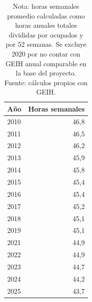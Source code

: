 \begin{table}[H]
\centering
\caption{Horas semanales promedio por trabajador, 2010--2025}
\label{tab:horas_semanales_promedio}
\small
\begin{tabular}{lr}
\toprule
Año & Horas semanales \\
\midrule
2010 & 46,8 \\
2011 & 46,5 \\
2012 & 46,2 \\
2013 & 45,9 \\
2014 & 45,8 \\
2015 & 45,4 \\
2016 & 45,4 \\
2017 & 45,2 \\
2018 & 45,1 \\
2019 & 45,1 \\
2021 & 44,9 \\
2022 & 44,9 \\
2023 & 44,7 \\
2024 & 44,2 \\
2025 & 43,7 \\
\bottomrule
\end{tabular}
\caption*{\footnotesize Nota: horas semanales promedio calculadas como horas anuales totales divididas por ocupados y por 52 semanas. Se excluye 2020 por no contar con GEIH anual comparable en la base del proyecto. Fuente: cálculos propios con GEIH.}
\end{table}